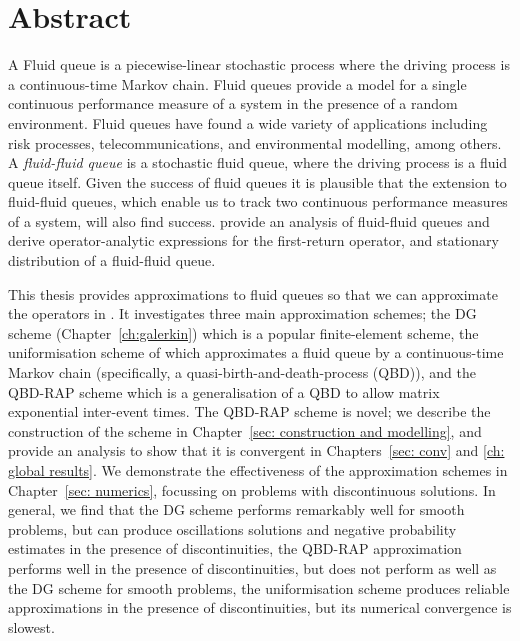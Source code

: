 \chapter{Abstract}
\label{ch:abstract}
A Fluid queue is a piecewise-linear stochastic process where the driving process is a continuous-time Markov chain. Fluid queues provide a model for a single continuous performance measure of a system in the presence of a random environment. Fluid queues have found a wide variety of applications including risk processes, telecommunications, and environmental modelling, among others. A \emph{fluid-fluid queue} is a stochastic fluid queue, where the driving process is a fluid queue itself. Given the success of fluid queues it is plausible that the extension to fluid-fluid queues, which enable us to track two continuous performance measures of a system, will also find success. \cite{bo2014} provide an analysis of fluid-fluid queues and derive operator-analytic expressions for the first-return operator, and stationary distribution of a fluid-fluid queue.

This thesis provides approximations to fluid queues so that we can approximate the operators in \cite{bo2014}. It investigates three main approximation schemes; the DG scheme (Chapter~\ref{ch:galerkin}) which is a popular finite-element scheme, the uniformisation scheme of \cite{bo2013} which approximates a fluid queue by a continuous-time Markov chain (specifically, a quasi-birth-and-death-process (QBD)), and the QBD-RAP scheme which is a generalisation of a QBD to allow matrix exponential inter-event times. The QBD-RAP scheme is novel; we describe the construction of the scheme in Chapter~\ref{sec: construction and modelling}, and provide an analysis to show that it is convergent in Chapters~\ref{sec: conv} and \ref{ch: global results}. We demonstrate the effectiveness of the approximation schemes in Chapter~\ref{sec: numerics}, focussing on problems with discontinuous solutions. In general, we find that the DG scheme performs remarkably well for smooth problems, but can produce oscillations solutions and negative probability estimates in the presence of discontinuities, the QBD-RAP approximation performs well in the presence of discontinuities, but does not perform as well as the DG scheme for smooth problems, the uniformisation scheme produces reliable approximations in the presence of discontinuities, but its numerical convergence is slowest. 


